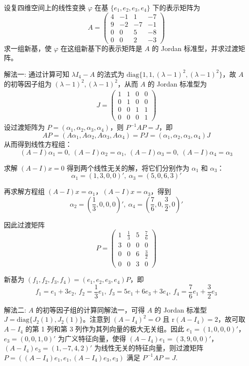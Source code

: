 \documentclass[../../main.tex]{subfiles}%
\begin{document}
\begin{example}\label{example:7.59}
设复四维空间上的线性变换 $\varphi$ 在基 $\{e_1,e_2,e_3,e_4\}$ 下的表示矩阵为
\[
A = \begin{pmatrix}
4 & -1 & 1 & -7 \\
9 & -2 & -7 & -1 \\
0 & 0 & 5 & -8 \\
0 & 0 & 2 & -3
\end{pmatrix}
\]
求一组新基，使 $\varphi$ 在这组新基下的表示矩阵是 $A$ 的 Jordan 标准型，并求过渡矩阵。
\end{example}
\begin{solution}

{\color{blue}解法一:}
通过计算可知 $\lambda I_4 - A$ 的法式为 $\mathrm{diag}\{1,1,(\lambda - 1)^2,(\lambda - 1)^2\}$，故 $A$ 的初等因子组为 $(\lambda - 1)^2,(\lambda - 1)^2$，从而 $A$ 的 Jordan 标准型为
\begin{align*}
J = \begin{pmatrix}
1 & 1 & 0 & 0 \\
0 & 1 & 0 & 0 \\
0 & 0 & 1 & 1 \\
0 & 0 & 0 & 1
\end{pmatrix}
\end{align*}
设过渡矩阵为 $P = (\alpha_1,\alpha_2,\alpha_3,\alpha_4)$，则 $P^{-1}AP = J$，即
\[AP = (A\alpha_1,A\alpha_2,A\alpha_3,A\alpha_4) = PJ = (\alpha_1,\alpha_2,\alpha_3,\alpha_4)J\]
从而得到线性方程组：
\[(A - I)\alpha_1 = 0,\ (A - I)\alpha_2 = \alpha_1,\ (A - I)\alpha_3 = 0,\ (A - I)\alpha_4 = \alpha_3\]

求解 $(A - I)x = 0$ 得到两个线性无关的解，将它们分别作为 $\alpha_1$ 和 $\alpha_3$：
\[\alpha_1 = (1,3,0,0)',\ \alpha_3 = (5,0,6,3)'\]

再求解方程组 $(A - I)x = \alpha_1$，$(A - I)x = \alpha_3$，得到
\[\alpha_2 = (\frac{1}{3},0,0,0)',\ \alpha_4 = (\frac{7}{6},0,\frac{3}{2},0)'\]

因此过渡矩阵
\[
P = \begin{pmatrix}
1 & \frac{1}{3} & 5 & \frac{7}{6} \\
3 & 0 & 0 & 0 \\
0 & 0 & 6 & \frac{3}{2} \\
0 & 0 & 3 & 0
\end{pmatrix}
\]

新基为 $(f_1,f_2,f_3,f_4) = (e_1,e_2,e_3,e_4)P$，即
\[f_1 = e_1 + 3e_2,\ f_2 = \frac{1}{3}e_1,\ f_3 = 5e_1 + 6e_3 + 3e_4,\ f_4 = \frac{7}{6}e_1 + \frac{3}{2}e_3\] 

{\color{blue}解法二:}
$A$ 的初等因子组的计算同解法一，可得 $A$ 的 Jordan 标准型 $J = \mathrm{diag}\{J_2(1),J_2(1)\}$。注意到 $(A - I_4)^2 = O$ 且 $\mathrm{r}(A - I_4) = 2$，故可取 $A - I_4$ 的第 1 列和第 3 列作为其列向量的极大无关组。因此 $e_1 = (1,0,0,0)'$，$e_3 = (0,0,1,0)'$ 为广义特征向量，使得 $(A - I_4)e_1 = (3,9,0,0)'$，$(A - I_4)e_3 = (1,-7,4,2)'$ 为线性无关的特征向量，则过渡矩阵 $P = ((A - I_4)e_1,e_1,(A - I_4)e_3,e_3)$ 满足 $P^{-1}AP = J$.

\end{solution}
\end{document}

